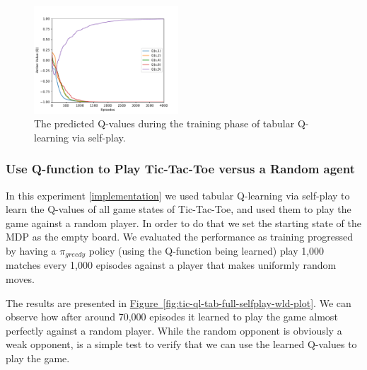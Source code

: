 \documentclass{article}
\newcommand{\GithubURL}[1]{[\href{https://github.com/davidrobles/mlnd-capstone-code/blob/master/#1}{implementation}]}
\begin{document}

\begin{figure}[!b]
    \centering
    \includegraphics[width=0.48\textwidth]{figures/tic_ql_tab_simple_selfplay_progress.pdf}
    \caption{The predicted Q-values during the training phase of tabular Q-learning via self-play.}
    \label{fig:tic-ql-tab-simple-selfplay-progress}
\end{figure}


\subsubsection{Use Q-function to Play Tic-Tac-Toe versus a Random agent}

In this experiment \GithubURL{experiments/tic_ql_tab_full_selfplay.py} we used tabular Q-learning via
self-play to learn the Q-values of all game states of Tic-Tac-Toe, and used them to play the game
against a random player. In order to do that we set the starting state of the MDP as the empty
board. We evaluated the performance as training progressed by having a $\pi_{greedy}$ policy (using
the Q-function being learned) play 1,000 matches every 1,000 episodes against a player that makes
uniformly random moves.

The results are presented in \hyperref[fig:tic-ql-tab-full-selfplay-wld-plot]
{Figure~\ref*{fig:tic-ql-tab-full-selfplay-wld-plot}}. We can observe how after around 70,000
episodes it learned to play the game almost perfectly against a random player. While the random
opponent is obviously a weak opponent, is a simple test to verify that we can use the learned
Q-values to play the game.

\end{document}
